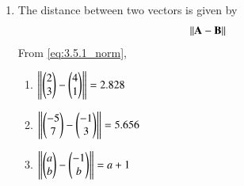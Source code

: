\renewcommand{\theequation}{\theenumi}
\begin{enumerate}[label=\arabic*.,ref=\thesubsubsection.\theenumi]
\item The distance between two vectors is given by 
\begin{align}
\left\lVert\mathbf{A}-\mathbf{B}\right\rVert
\label{eq:3.5.1_norm}
\end{align}
From \eqref{eq:3.5.1_norm},
\begin{enumerate}
\item 
$\left\lVert\begin{pmatrix}2\\3\end{pmatrix}-\begin{pmatrix}4\\1\end{pmatrix}\right\rVert=2.828$
\item $\left\lVert\begin{pmatrix}-5\\7\end{pmatrix}-\begin{pmatrix}-1\\3\end{pmatrix}\right\rVert=5.656$
\item $\left\lVert\begin{pmatrix}a\\b\end{pmatrix}-\begin{pmatrix}-1\\b\end{pmatrix}\right\rVert=a+1$

\end{enumerate}
\end{enumerate}
